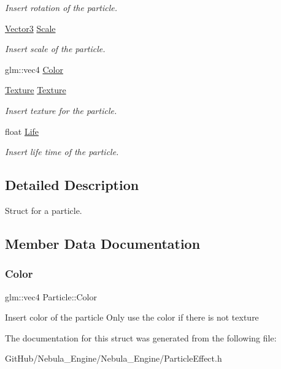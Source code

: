 \begin{DoxyCompactItemize}
\begin{DoxyCompactList}\small\item\em Insert rotation of the particle. \end{DoxyCompactList}\item 
\mbox{\label{struct_particle_a4bcfec2f1d619eca95594f8b3c7ec1ef}} 
\mbox{\hyperlink{struct_vector3}{Vector3}} \mbox{\hyperlink{struct_particle_a4bcfec2f1d619eca95594f8b3c7ec1ef}{Scale}}
\begin{DoxyCompactList}\small\item\em Insert scale of the particle. \end{DoxyCompactList}\item 
glm\+::vec4 \mbox{\hyperlink{struct_particle_ad2172b343de2cc481e14534de085b3e0}{Color}}
\item 
\mbox{\label{struct_particle_aaf47cd9363796274d0583f66a61df617}} 
\mbox{\hyperlink{class_texture}{Texture}} \mbox{\hyperlink{struct_particle_aaf47cd9363796274d0583f66a61df617}{Texture}}
\begin{DoxyCompactList}\small\item\em Insert texture for the particle. \end{DoxyCompactList}\item 
\mbox{\label{struct_particle_a983c8e384595942ebcf34539120d4a37}} 
float \mbox{\hyperlink{struct_particle_a983c8e384595942ebcf34539120d4a37}{Life}}
\begin{DoxyCompactList}\small\item\em Insert life time of the particle. \end{DoxyCompactList}\end{DoxyCompactItemize}


\subsection{Detailed Description}
Struct for a particle. 

\subsection{Member Data Documentation}
\mbox{\label{struct_particle_ad2172b343de2cc481e14534de085b3e0}} 
\subsubsection{\texorpdfstring{Color}{Color}}
{\footnotesize\ttfamily glm\+::vec4 Particle\+::\+Color}

Insert color of the particle Only use the color if there is not texture 

The documentation for this struct was generated from the following file\+:\begin{DoxyCompactItemize}
\item 
Git\+Hub/\+Nebula\+\_\+\+Engine/\+Nebula\+\_\+\+Engine/Particle\+Effect.\+h\end{DoxyCompactItemize}
